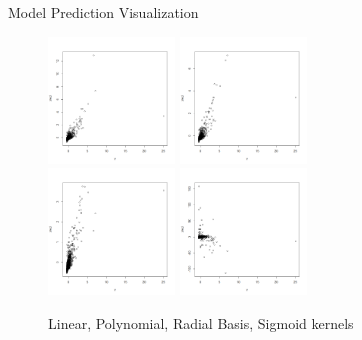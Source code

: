 \documentclass[presentation]{beamer}
\begin{document}
\begin{frame}{Model Prediction Visualization}
  \begin{figure}[ht]
    \scriptsize
    \centering
    \includegraphics[width=0.3\textwidth]{images/wholepng/whole-linear.png}
    \includegraphics[width=0.3\textwidth]{images/wholepng/whole-polynomial.png}\\
    \includegraphics[width=0.3\textwidth]{images/wholepng/whole-radial.png}
    \includegraphics[width=0.3\textwidth]{images/wholepng/whole-sigmoid.png} 
    \caption{Linear, Polynomial, Radial Basis, Sigmoid kernels}
  \end{figure}
\end{frame}
\end{document}
